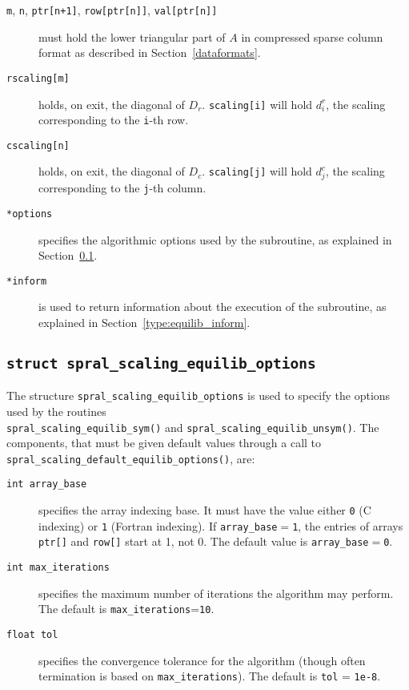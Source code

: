 \begin{description}

\item[\texttt{m}, \texttt{n}, \texttt{ptr[n+1]}, \texttt{row[ptr[n]]}, \texttt{val[ptr[n]]}] must hold the lower triangular part of $A$ in compressed sparse column format as described in Section~\ref{dataformats}.

\item[\texttt{rscaling[m]}] holds, on exit, the diagonal of $D_r$.
\texttt{scaling[i]} will hold $d_i^r$, the scaling corresponding to the
\texttt{i}-th row.

\item[\texttt{cscaling[n]}] holds, on exit, the diagonal of $D_c$.
\texttt{scaling[j]} will hold $d_j^c$, the scaling corresponding to the
\texttt{j}-th column.

\item[\texttt{*options}] specifies the algorithmic options used by the subroutine, as explained in Section~\ref{type:equilib_options}.

\item[\texttt{*inform}] is used to return information about the execution of the subroutine, as explained in Section~\ref{type:equilib_inform}.


\end{description}

\subsection{\texttt{struct spral\_scaling\_equilib\_options}} \label{type:equilib_options}

The structure \texttt{spral\_scaling\_equilib\_options} is used to specify the options
used by the routines \\\texttt{spral\_scaling\_equilib\_sym()} and \texttt{spral\_scaling\_equilib\_unsym()}. The components, that
must be given default values through a call to \texttt{spral\_scaling\_default\_equilib\_options()}, are:

\begin{description}

\item[\texttt{int array\_base}] specifies the array indexing base. It must
   have the value either \texttt{0} (C indexing) or \texttt{1} (Fortran
   indexing). If \texttt{array\_base}$=$\texttt{1}, the entries of arrays
   \texttt{ptr[]} and \texttt{row[]} start at 1, not 0.
   The default value is \texttt{array\_base}$=$\texttt{0}.

\item[\texttt{int max\_iterations}] specifies the maximum number of iterations the algorithm may perform. The default is \texttt{max\_iterations}=\texttt{10}.

\item[\texttt{float tol}] specifies the convergence tolerance for the algorithm (though often termination is based on \texttt{max\_iterations}). The default is \texttt{tol} = \texttt{1e-8}.

\end{description}

